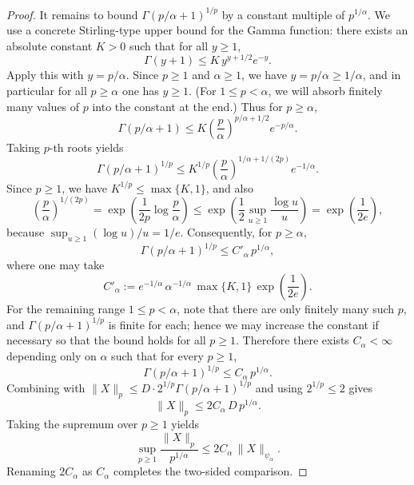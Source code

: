 \documentclass[12pt]{article}
\renewcommand{\(}{\left(}%
\renewcommand{\)}{\right)}%
\renewcommand{\[}{\left[}%
\renewcommand{\]}{\right]}%
\newtheorem{proof}{Proof.}}
\begin{document}
\begin{proof}
It remains to bound $\Gamma(p/\alpha+1)^{1/p}$ by a constant multiple of $p^{1/\alpha}$. We use a concrete Stirling-type upper bound for the Gamma function: there exists an absolute constant $K>0$ such that for all $y\ge 1$,
\begin{equation*}
\Gamma(y+1)\le K\,y^{y+1/2}e^{-y}.
\end{equation*}
Apply this with $y=p/\alpha$. Since $p\ge 1$ and $\alpha\ge 1$, we have $y=p/\alpha\ge 1/\alpha$, and in particular for all $p\ge \alpha$ one has $y\ge 1$. (For $1\le p<\alpha$, we will absorb finitely many values of $p$ into the constant at the end.) Thus for $p\ge \alpha$,
\begin{equation*}
\Gamma(p/\alpha+1)
\le K\left(\frac{p}{\alpha}\right)^{p/\alpha+1/2}e^{-p/\alpha}.
\end{equation*}
Taking $p$-th roots yields
\begin{equation*}
\Gamma(p/\alpha+1)^{1/p}
\le K^{1/p}\left(\frac{p}{\alpha}\right)^{1/\alpha+1/(2p)}e^{-1/\alpha}.
\end{equation*}
Since $p\ge 1$, we have $K^{1/p}\le \max\{K,1\}$, and also
\begin{equation*}
\left(\frac{p}{\alpha}\right)^{1/(2p)}
= \exp\!\left(\frac{1}{2p}\log\frac{p}{\alpha}\right)
\le \exp\!\left(\frac{1}{2}\sup_{u\ge 1}\frac{\log u}{u}\right)
= \exp\!\left(\frac{1}{2e}\right),
\end{equation*}
because $\sup_{u\ge 1}(\log u)/u=1/e$. Consequently, for $p\ge \alpha$,
\begin{equation*}
\Gamma(p/\alpha+1)^{1/p}\le C'_\alpha\,p^{1/\alpha},
\end{equation*}
where one may take
\begin{equation*}
C'_\alpha:= e^{-1/\alpha}\,\alpha^{-1/\alpha}\,\max\{K,1\}\,\exp\!\left(\frac{1}{2e}\right).
\end{equation*}
For the remaining range $1\le p<\alpha$, note that there are only finitely many such $p$, and $\Gamma(p/\alpha+1)^{1/p}$ is finite for each; hence we may increase the constant if necessary so that the bound holds for all $p\ge 1$. Therefore there exists $C_\alpha<\infty$ depending only on $\alpha$ such that for every $p\ge 1$,
\begin{equation*}
\Gamma(p/\alpha+1)^{1/p}\le C_\alpha\,p^{1/\alpha}.
\end{equation*}
Combining with $\|X\|_p\le D\cdot 2^{1/p}\Gamma(p/\alpha+1)^{1/p}$ and using $2^{1/p}\le 2$ gives
\begin{equation*}
\|X\|_p\le 2C_\alpha\,D\,p^{1/\alpha}.
\end{equation*}
Taking the supremum over $p\ge 1$ yields
\begin{equation*}
\sup_{p\ge 1}\frac{\|X\|_p}{p^{1/\alpha}}
\le 2C_\alpha\,\|X\|_{\psi_\alpha}.
\end{equation*}
Renaming $2C_\alpha$ as $C_\alpha$ completes the two-sided comparison.


\end{proof}
\end{document}
